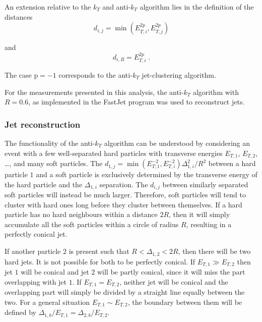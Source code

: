 \documentclass[12pt, twoside]{article}
\numberwithin{equation}{section}
\numberwithin{figure}{section}
\begin{document}
An extension relative to the $k_{T}$ and anti-$k_{T}$ algorithm lies in the definition of the distances
\begin{equation}    \label{eq:AlgorithmDistanceDefinition}
    d_{i,j} = \min \left(E^{2p}_{T,i}, E^{2p}_{T,j} \right)
\end{equation}

and
\begin{equation}    	\label{eq:DistanceToBeam}
    d_{i,B} = E^{2p}_{T,i} \;.
\end{equation}

The case $\text{p} = -1$ corresponds to the anti-$k_{T}$ jet-clustering algorithm.

For the measurements presented in this analysis, the anti-$k_{T}$ algorithm with $R=0.6$, as implemented in the FastJet program was used to reconstruct jets.

\subsubsection{Jet reconstruction}
\label{subsubsec:JetReconstruction}

The functionality of the anti-$k_{T}$ algorithm can be understood by considering an event with a few well-separated hard particles with transverse energies $E_{T,1}$, $E_{T,2}$, \ldots, and many soft particles. The $d_{1,j} = \min \left(E^{-2}_{T,1}, E^{-2}_{T,i} \right) \Delta^{2}_{1,i}/R^{2}$ between a hard particle $1$ and a soft particle is exclusively determined by the transverse energy of the hard particle and the $\Delta_{1,i}$ separation. The $d_{i,j}$ between similarly separated soft particles will instead be much larger. Therefore, soft particles will tend to cluster with hard ones long before they cluster between themselves. If a hard particle has no hard neighbours within a distance $2R$, then it will simply accumulate all the soft particles within a circle of radius $R$, resulting in a perfectly conical jet.

If another particle $2$ is present such that $R < \Delta_{1,2} < 2R$, then there will be two hard jets. It is not possible for both to be perfectly conical. If $E_{T,1} \gg E_{T,2}$ then jet $1$ will be conical and jet $2$ will be partly conical, since it will miss the part overlapping with jet $1$. If $E_{T,1} = E_{T,2}$, neither jet will be conical and the overlapping part will simply be divided by a straight line equally between the two. For a general situation $E_{T,1} \sim E_{T,2}$, the boundary between them will be defined by $\Delta_{1,b}/E_{T,1} = \Delta_{2,b}/E_{T,2}$.
\end{document}
